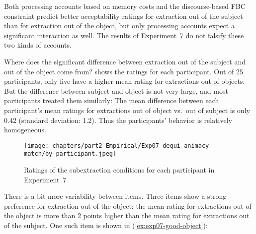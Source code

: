Both processing accounts based on memory costs and the discourse-based FBC constraint predict better acceptability ratings for extraction out of the subject than for extraction out of the object, but only processing accounts expect a significant interaction as well. The results of Experiment~7 do not falsify these two kinds of accounts.

Where does the significant difference between extraction out of the subject and out of the object come from?  shows the ratings for each participant. Out of 25 participants, only five have a higher mean rating for extractions out of objects. But the difference between subject and object is not very large, and most participants treated them similarly: The mean difference between each participant's mean ratings for extractions out of object vs.\ out of subject is only 0.42 (standard deviation: 1.2). Thus the participants' behavior is relatively homogeneous. 

\begin{figure}
    \centering
    \texttt{[image: chapters/part2-Empirical/Exp07-dequi-animacy-match/by-participant.jpeg]}
    \caption{Ratings of the subextraction conditions for each participant in Experiment~7}
    \label{fig:exp07-byparticipant}
\end{figure}

There is a bit more variability between items. Three items show a strong preference for extraction out of the object: the mean rating for extractions out of the object is more than 2 points higher than the mean rating for extractions out of the subject. One such item is shown in (\ref{ex:exp07-good-object}):\pagebreak

\eal\label{ex:exp07-good-object}
\zl 

